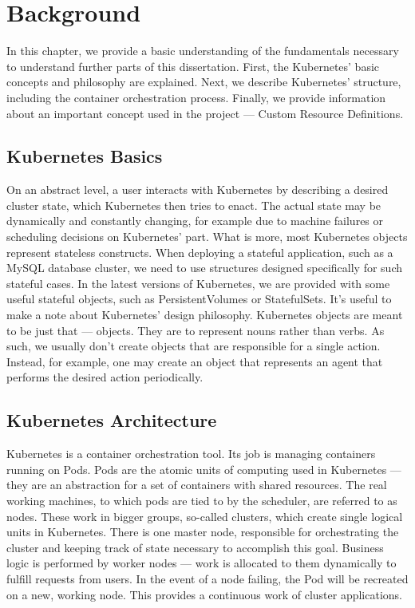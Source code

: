 \chapter{Background}

In this chapter, we provide a basic understanding of the fundamentals necessary to understand
further parts of this dissertation. First, the Kubernetes’ basic concepts and philosophy are
explained. Next, we describe Kubernetes’ structure, including the container orchestration process.
Finally, we provide information about an important concept used in the project --- Custom Resource
Definitions.

\section{Kubernetes Basics}
On an abstract level, a user interacts with Kubernetes by describing a desired cluster state, which
Kubernetes then tries to enact. The actual state may be dynamically and constantly changing, for
example due to machine failures or scheduling decisions on Kubernetes' part. What is more, most
Kubernetes objects represent stateless constructs. When deploying a stateful application, such as a
MySQL database cluster, we need to use structures designed specifically for such stateful cases. In
the latest versions of Kubernetes, we are provided with some useful stateful objects, such as
PersistentVolumes or StatefulSets. It’s useful to make a note about Kubernetes’ design philosophy.
Kubernetes objects are meant to be just that --- objects. They are to represent nouns rather than
verbs. As such, we usually don’t create objects that are responsible for a single action. Instead,
for example, one may create an object that represents an agent that performs the desired action
periodically.

\section{Kubernetes Architecture}

Kubernetes is a container orchestration tool. Its job is managing containers running on Pods. Pods
are the atomic units of computing used in Kubernetes --- they are an abstraction for a set of
containers with shared resources. The real working machines, to which pods are tied to by the
scheduler, are referred to as nodes. These work in bigger groups, so-called clusters, which
create single logical units in Kubernetes. There is one master node, responsible for orchestrating
the cluster and keeping track of state necessary to accomplish this goal. Business logic is
performed by worker nodes --- work is allocated to them dynamically to fulfill requests from users.
In the event of a node failing, the Pod will be recreated on a new, working node. This provides a
continuous work of cluster applications.

